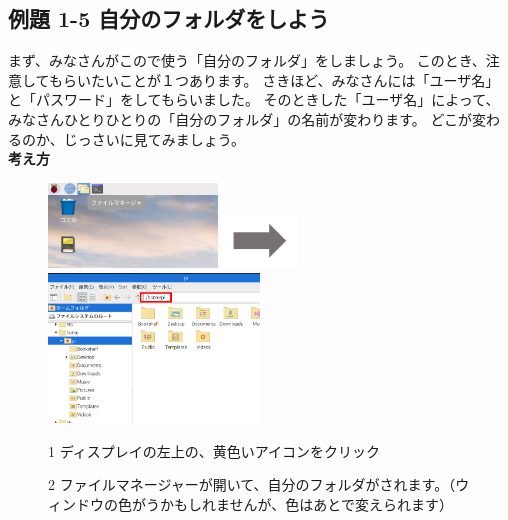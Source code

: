 \subsection{例題 1-5 自分のフォルダをしよう}
まず、みなさんがこので使う「自分のフォルダ」をしましょう。
このとき、注意してもらいたいことが１つあります。
さきほど、みなさんには「ユーザ名」と「パスワード」をしてもらいました。
そのときした「ユーザ名」によって、みなさんひとりひとりの「自分のフォルダ」の名前が変わります。
どこが変わるのか、じっさいに見てみましょう。\\

{\bf \large 考え方}\\
\begin{figure}[ht]
  \begin{minipage}{\textwidth}
    \includegraphics[width=0.4\textwidth]{text01-img/textbook-img032.png}
    \includegraphics[width=2cm]{text01-img/textbook-img035.png}
    \includegraphics[width=0.5\textwidth]{text01-img/textbook-img1020.png}
  \end{minipage}
  \begin{minipage}{0.4\textwidth}
    1
    ディスプレイの左上の、黄色いアイコンをクリック
  \end{minipage}
  \hspace{2cm}
  \vspace{20pt}
  \begin{minipage}{0.5\textwidth}
    \vspace{20pt}
    2
    ファイルマネージャーが開いて、自分のフォルダがされます。（ウィンドウの色がうかもしれませんが、色はあとで変えられます）
  \end{minipage}
\end{figure}

